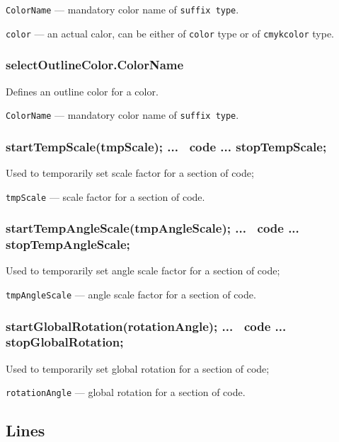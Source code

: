 \documentclass{ltxdoc}
\begin{document}
	\texttt{ColorName} — mandatory color name of \texttt{suffix type}.
	
	\texttt{color} — an actual calor, can be either of \texttt{color} type or of \texttt{cmykcolor} type.

\subsubsection{selectOutlineColor.ColorName}
	
	Defines an outline color for a color.

	\texttt{ColorName} — mandatory color name of \texttt{suffix type}.
	

\subsubsection{startTempScale(tmpScale); ... \METAPOST\ code ... stopTempScale;}

	Used to temporarily set scale factor for a section of code;

	\texttt{tmpScale} — scale factor for a section of code.
		
\subsubsection{startTempAngleScale(tmpAngleScale); ... \METAPOST\ code ... stopTempAngleScale;}

	Used to temporarily set angle scale factor for a section of code;

	\texttt{tmpAngleScale} — angle scale factor for a section of code.

\subsubsection{startGlobalRotation(rotationAngle); ... \METAPOST\ code ... stopGlobalRotation;}

	Used to temporarily set global rotation for a section of code;

	\texttt{rotationAngle} — global rotation for a section of code.
	



\subsection{Lines}
\end{document}
